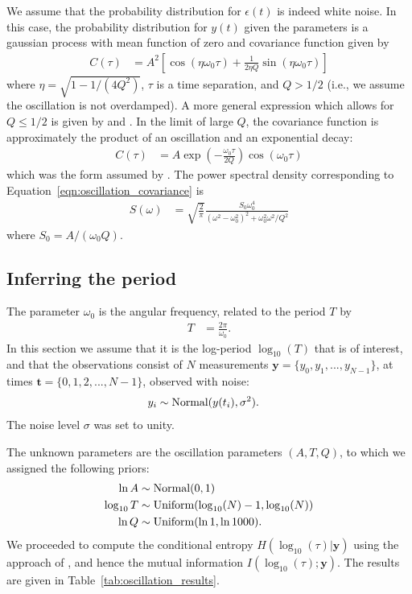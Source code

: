 \documentclass[a4paper, 12pt]{article}
\begin{document}
We assume that the probability distribution for $\epsilon(t)$ is indeed white
noise. In this case, the probability distribution for $y(t)$ given the
parameters is a gaussian process with mean function of zero and
covariance function given by
\begin{align}
C(\tau) &= A^2\left[\cos(\eta\omega_0\tau)
                + \frac{1}{2\eta Q}\sin(\eta\omega_0\tau)\right]
    \label{eqn:oscillation_covariance}
\end{align}
where $\eta = \sqrt{1 - 1/(4Q^2)}$, $\tau$ is a time separation,
and $Q > 1/2$ (i.e., we assume the oscillation is not overdamped).
A more general expression which allows for $Q \leq 1/2$
is given by \citet{anderson} and \citet{celerite}.
In the limit of large $Q$, the covariance function is approximately
the product of an oscillation and an exponential decay:
\begin{align}
C(\tau) &= A\exp\left(-\frac{\omega_0\tau}{2Q}\right)\cos(\omega_0\tau)
\end{align}
which was the form assumed by \citet{brewer_stello}.
The power spectral density corresponding to
Equation~\ref{eqn:oscillation_covariance} is
\begin{align}
S(\omega) &= \sqrt{\frac{2}{\pi}}
             \frac{S_0\omega_0^4}
                  {(\omega^2 - \omega_0^2)^2 + \omega_0^2\omega^2/Q^2}
\end{align}
where $S_0 = A/(\omega_0Q)$.

\subsection{Inferring the period}
The parameter $\omega_0$ is the angular frequency, related to the period
$T$ by
\begin{align}
T &= \frac{2\pi}{\omega_0}.
\end{align}
In this section we assume that it is the log-period $\log_{10}(T)$ that is
of interest, and that the observations consist of $N$ measurements
$\boldsymbol{y} = \{y_0, y_1, ..., y_{N-1}\}$,
at times $\boldsymbol{t} = \{0,1,2,...,N-1\}$, observed with noise:
\begin{align}
y_i &\sim \textnormal{Normal}(y(t_i), \sigma^2).
\end{align}
The noise level $\sigma$ was set to unity.

The unknown parameters are the oscillation parameters $(A, T, Q)$, to which
we assigned the following priors:
\begin{align}
\ln A &\sim \textnormal{Normal}(0, 1) \\
\log_{10} T &\sim \textnormal{Uniform}(\log_{10}(N) - 1, \log_{10}(N)) \\
\ln Q &\sim \textnormal{Uniform}(\ln 1, \ln 1000).
\end{align}
We proceeded to compute the conditional entropy
$H(\log_{10}(\tau) | \boldsymbol{y})$ using the approach of \citet{brewer},
and hence the mutual information $I(\log_{10}(\tau) ; \boldsymbol{y})$.
The results are given in Table~\ref{tab:oscillation_results}.
\end{document}
